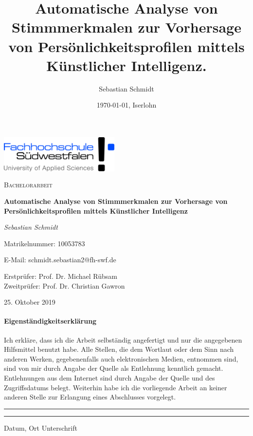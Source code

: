\documentclass[11pt,bibliography=totocnumbered]{scrartcl}
\title{Automatische Analyse von Stimmmerkmalen zur Vorhersage von Persönlichkeitsprofilen mittels Künstlicher Intelligenz.}
\author{Sebastian Schmidt}
\date{\today{}, Iserlohn}
\begin{document}
 
\setmainfont{Caladea}
\begin{titlepage}
	\centering
	\includegraphics[width=0.45\textwidth]{fh-swf-logo}\par\vspace{1cm}
	{\scshape\Large Bachelorarbeit\par}
	\vspace{0.5cm}
	{\huge\bfseries Automatische Analyse von Stimmmerkmalen zur Vorhersage von Persönlichkeitsprofilen mittels Künstlicher Intelligenz\par}
	\vspace{1cm}
	{\Large\itshape Sebastian Schmidt\par}
	Matrikelnummer: 10053783\par
	E-Mail: schmidt.sebastian2@fh-swf.de\par
	\vspace{1cm}
	Erstprüfer: 
	Prof. Dr. Michael Rübsam\\ 
	\vspace{1mm}
	Zweitprüfer: 
	Prof. Dr. Christian Gawron
	\vfill
	
	{\large 25. Oktober 2019\par}
\end{titlepage}
\pagebreak
\paragraph{Eigenständigkeitserklärung}
Ich erkläre, dass ich die Arbeit selbständig angefertigt und nur die angegebenen Hilfsmittel benutzt habe. Alle Stellen, die dem Wortlaut oder dem Sinn nach anderen Werken, gegebenenfalls auch elektronischen Medien, entnommen sind, sind von mir durch Angabe der Quelle als Entlehnung kenntlich gemacht. Entlehnungen aus dem Internet sind durch Angabe der Quelle und des Zugriffsdatums belegt. Weiterhin habe ich die vorliegende 
Arbeit an keiner anderen Stelle zur Erlangung eines Abschlusses vorgelegt.

\vspace{50pt}
\noindent\rule{5cm}{.4pt}\hspace{4.8cm}\rule{5cm}{.4pt}\par
\noindent Datum, Ort \hspace{10.5cm} Unterschrift
\pagebreak
\tableofcontents
\pagebreak
\listoffigures
\lstlistoflistings
\pagebreak
\listofmyequations
{}
\pagestyle{scrheadings}
\clearscrheadfoot
\ohead[\pagemark]{\pagemark}
\ihead[]{\headmark}
\setcounter{equation}{0}
\pagebreak
\end{document}
